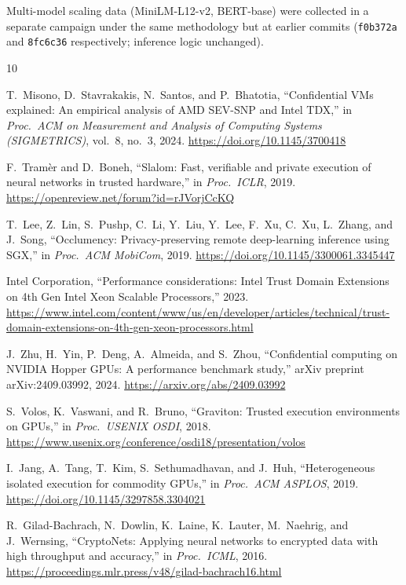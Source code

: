 \documentclass[11pt,a4paper]{article}
\begin{document}
Multi-model scaling data (MiniLM-L12-v2, BERT-base) were collected in a separate campaign under the same methodology but at earlier commits (\texttt{f0b372a} and \texttt{8fc6c36} respectively; inference logic unchanged).

\begin{thebibliography}{10}

T.~Misono, D.~Stavrakakis, N.~Santos, and P.~Bhatotia,
``Confidential VMs explained: An empirical analysis of AMD SEV-SNP and Intel TDX,''
in \emph{Proc.\ ACM on Measurement and Analysis of Computing Systems (SIGMETRICS)}, vol.~8, no.~3, 2024.
\url{https://doi.org/10.1145/3700418}

F.~Tram\`er and D.~Boneh,
``Slalom: Fast, verifiable and private execution of neural networks in trusted hardware,''
in \emph{Proc.\ ICLR}, 2019.
\url{https://openreview.net/forum?id=rJVorjCcKQ}

T.~Lee, Z.~Lin, S.~Pushp, C.~Li, Y.~Liu, Y.~Lee, F.~Xu, C.~Xu, L.~Zhang, and J.~Song,
``Occlumency: Privacy-preserving remote deep-learning inference using SGX,''
in \emph{Proc.\ ACM MobiCom}, 2019.
\url{https://doi.org/10.1145/3300061.3345447}

Intel Corporation,
``Performance considerations: Intel Trust Domain Extensions on 4th Gen Intel Xeon Scalable Processors,''
2023.
\url{https://www.intel.com/content/www/us/en/developer/articles/technical/trust-domain-extensions-on-4th-gen-xeon-processors.html}

J.~Zhu, H.~Yin, P.~Deng, A.~Almeida, and S.~Zhou,
``Confidential computing on NVIDIA Hopper GPUs: A performance benchmark study,''
arXiv preprint arXiv:2409.03992, 2024.
\url{https://arxiv.org/abs/2409.03992}

S.~Volos, K.~Vaswani, and R.~Bruno,
``Graviton: Trusted execution environments on GPUs,''
in \emph{Proc.\ USENIX OSDI}, 2018.
\url{https://www.usenix.org/conference/osdi18/presentation/volos}

I.~Jang, A.~Tang, T.~Kim, S.~Sethumadhavan, and J.~Huh,
``Heterogeneous isolated execution for commodity GPUs,''
in \emph{Proc.\ ACM ASPLOS}, 2019.
\url{https://doi.org/10.1145/3297858.3304021}

R.~Gilad-Bachrach, N.~Dowlin, K.~Laine, K.~Lauter, M.~Naehrig, and J.~Wernsing,
``CryptoNets: Applying neural networks to encrypted data with high throughput and accuracy,''
in \emph{Proc.\ ICML}, 2016.
\url{https://proceedings.mlr.press/v48/gilad-bachrach16.html}


\end{thebibliography}
\end{document}
